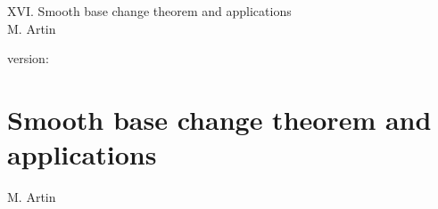 \documentclass[10pt]{../fichiers-configuration-latex/smfart}
\begin{document}
\begin{center}
XVI. Smooth base change theorem and applications\\
M. Artin
\end{center}

version: \showgitstatus
\tableofcontents

\else
\chapter{Smooth base change theorem and applications}
\begin{center}
M. Artin
\end{center}
\fi
{}\label{sga4.exp.XVI}














\end{document}
